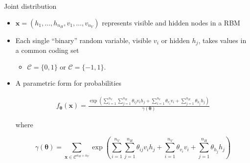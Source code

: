 \documentclass[ignorenonframetext,]{beamer}
\providecommand{\tightlist}{%
  \setlength{\itemsep}{0pt}\setlength{\parskip}{0pt}}
\theoremstyle{definition}
\newcommand{\nv}{{n_{\scriptscriptstyle V}}}
\newcommand{\nh}{{n_{\scriptscriptstyle H}}}
\begin{document}
\begin{frame}{Joint distribution}
\protect\hypertarget{joint-distribution}{}

\begin{itemize}
\item
  \(\boldsymbol x = (h_1, \dots, h_{\nh}, v_1,\dots,v_{\nv})\)
  represents visible and hidden nodes in a RBM
\item
  Each single ``binary'' random variable, visible \(v_i\) or hidden
  \(h_j\), takes values in a common coding set

  \begin{itemize}
  \tightlist
  \item
    \(\mathcal{C}=\{0,1\}\) or \(\mathcal{C}=\{-1,1\}\).
  \end{itemize}
\item
  A parametric form for probabilities

  \begin{align*} 
    \label{eqn:pmf} 
    f_{\boldsymbol \theta} (\boldsymbol x) = \frac{\exp\left(\sum\limits_{i = 1}^{\nv} \sum\limits_{j=1}^{\nh} \theta_{ij} v_i h_j + \sum\limits_{i = 1}^{\nv}\theta_{v_i} v_i + \sum\limits_{j = 1}^{\nh}\theta_{h_j} h_j\right)}{\gamma(\boldsymbol \theta)} \end{align*}

  where

  \[\gamma(\boldsymbol \theta) = \sum\limits_{\boldsymbol x \in \mathcal{C}^{\nh + \nv}}\exp\left(\sum\limits_{i = 1}^{\nv} \sum\limits_{j=1}^{\nh} \theta_{ij} v_i h_j + \sum\limits_{i = 1}^{\nv}\theta_{v_i} v_i + \sum\limits_{j = 1}^{\nh}\theta_{h_j} h_j\right)\]
\end{itemize}

\end{frame}
\end{document}
